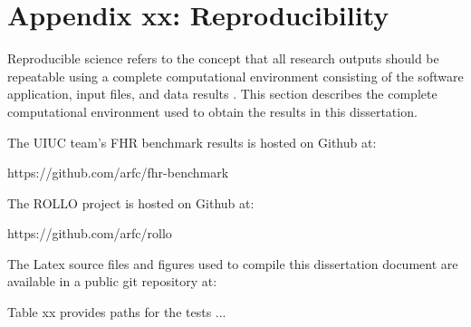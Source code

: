 \chapter{Appendix xx: Reproducibility} 

Reproducible science refers to the concept that all research outputs should be 
repeatable using a complete computational environment consisting of the software 
application, input files, and data results \cite{novak_multiscale_2020}.
This section describes the complete computational environment used to obtain the 
results in this dissertation.

The UIUC team's \gls{FHR} benchmark results is hosted on Github at: 

https://github.com/arfc/fhr-benchmark

The \gls{ROLLO} project is hosted on Github at: 

https://github.com/arfc/rollo

The Latex source files and figures used to compile this dissertation document 
are available in a public git repository at: 




Table xx provides paths for the tests ... 